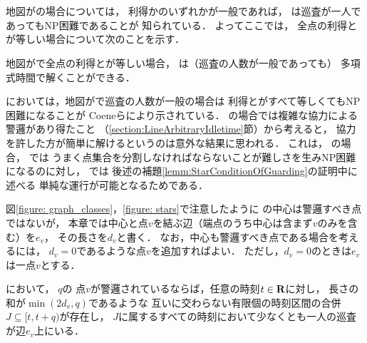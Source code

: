 \chapter{{\graphStar}}
\label{chapter: star}

地図が{\graphStar}の場合については，
利得か{\maxIdletime}のいずれかが一般であれば，
{\PPProfit}は巡査が一人であってもNP困難であることが
知られている\cite[Theorems 5 and 6]{coene2011charlemagne}．
よってここでは，
全点の利得と{\maxIdletime}が等しい場合について次のことを示す．

\begin{theo}
  \label{theo:StarUnaryProfitAndIdletime}
  地図が{\graphStar}で全点の利得と{\maxIdletime}が等しい場合，
  {\PPProfit}は（巡査の人数が一般であっても）
  多項式時間で解くことができる．
\end{theo}

{\independentPP}においては，地図が{\graphStar}で巡査の人数が一般の場合は
利得と{\maxIdletime}がすべて等しくてもNP困難になることが
Coeneらにより示されている\cite[Theorem~10]{coene2011charlemagne}．
{\graphLine}の場合では複雑な協力による警邏があり得たこと
（\ref{section:LineArbitraryIdletime}節）から考えると，
協力を許した方が簡単に解けるというのは意外な結果に思われる．
これは，
{\graphStar}の場合，
{\independentPP}では
うまく点集合を分割しなければならないことが難しさを生みNP困難になるのに対し，
{\PPProfit}では
後述の補題\ref{lemm:StarConditionOfGuarding}の証明中に述べる
単純な運行が可能となるためである．

図\ref{figure: graph_classes}，\ref{figure: stars}で注意したように
{\graphStar}の中心は警邏すべき点ではないが，
本章では中心と点$v$を結ぶ辺（端点のうち中心は含まず$v$のみを含む）を$e_v$，
その長さを$d_v$と書く．
なお，中心も警邏すべき点である場合を考えるには，
$d_v = 0$であるような点$v$を追加すればよい．
ただし，$d_v = 0$のときは$e_v$は一点$v$とする．

\begin{lemm}
  \label{lemm:StarCostOfVertex}
  {\graphStar}において，
  {\maxIdletime}$q$の
  点$v$が警邏されているならば，任意の時刻$t \in \mathbf R$に対し，
  長さの和が$\min(2d_v, q)$であるような
  互いに交わらない有限個の時刻区間の合併$J \subseteq [t, t + q)$が存在し，
  $J$に属するすべての時刻において少なくとも一人の巡査が辺$e_v$上にいる．
\end{lemm}

